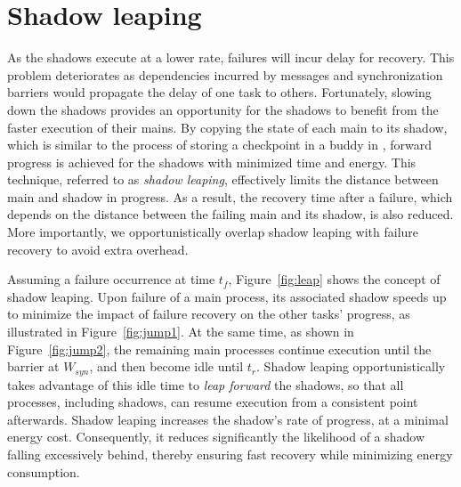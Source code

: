\section{Shadow leaping}
\label{sec:leaping_shadows}

As the shadows execute at a lower rate, failures will incur delay for recovery. This problem deteriorates as dependencies incurred by messages and synchronization barriers would propagate the delay of one task to others.  
Fortunately, slowing down the shadows provides an opportunity for the shadows to benefit from the faster execution of their mains. By copying the state of each main to its shadow, which is similar to the process of storing a checkpoint in a buddy in \cite{zheng_2004_ftccharm}, forward progress is achieved for the shadows with minimized time and energy. This technique, referred to as \textit{shadow leaping}, effectively limits the distance between main and shadow in progress. 
As a result, the recovery time after a failure, which depends on the distance between the failing main 
and its shadow, is also reduced. 
More importantly, 
we opportunistically overlap shadow leaping with failure recovery to avoid extra overhead. 

Assuming a failure occurrence at time $t_f$, Figure~\ref{fig:leap} shows the concept of shadow leaping. 
Upon failure of a main process, its associated shadow speeds up to minimize the impact of failure recovery on the other tasks' progress, as illustrated in Figure~\ref{fig:jump1}. 
At the same time, as shown in Figure~\ref{fig:jump2}, the remaining main processes continue execution until the barrier at $W_{syn}$, and then become idle until $t_r$. 
Shadow leaping opportunistically takes advantage of this idle time to {\it leap forward} the shadows, so that  
all processes, including shadows, can resume execution from a consistent point afterwards. 
Shadow leaping increases the shadow's rate of progress, at a minimal energy cost. Consequently, it reduces significantly the likelihood of a shadow falling excessively behind, thereby ensuring fast recovery while minimizing energy consumption.


